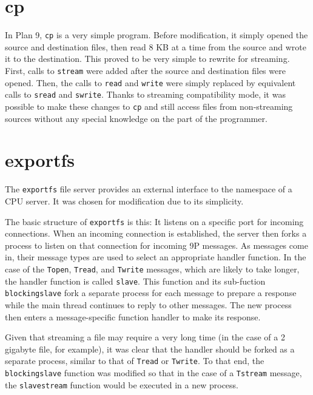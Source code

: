 \documentclass[11pt,american]{report}
\begin{document}
\section{cp}

In Plan 9, {\tt cp} is a very simple program. Before modification, it simply opened the source and destination files, then read 8 KB at a time from the source and wrote it to the destination. This proved to be very simple to rewrite for streaming. First, calls to {\tt stream} were added after the source and destination files were opened. Then, the calls to {\tt read} and {\tt write} were simply replaced by equivalent calls to {\tt sread} and {\tt swrite}. Thanks to streaming compatibility mode, it was possible to make these changes to {\tt cp} and still access files from non-streaming sources without any special knowledge on the part of the programmer.

\section{exportfs}

The {\tt exportfs} file server provides an external interface to the namespace of a CPU server. It was chosen for modification due to its simplicity.

The basic structure of {\tt exportfs} is this: It listens on a specific port for incoming connections. When an incoming connection is established, the server then forks a process to listen on that connection for incoming 9P messages. As messages come in, their message types are used to select an appropriate handler function. In the case of the {\tt Topen}, {\tt Tread}, and {\tt Twrite} messages, which are likely to take longer, the handler function is called {\tt slave}. This function and its sub-fuction {\tt blockingslave} fork a separate process for each message to prepare a response while the main thread continues to reply to other messages. The new process then enters a message-specific function handler to make its response.

Given that streaming a file may require a very long time (in the case of a 2 gigabyte file, for example), it was clear that the handler should be forked as a separate process, similar to that of {\tt Tread} or {\tt Twrite}. To that end, the {\tt blockingslave} function was modified so that in the case of a {\tt Tstream} message, the {\tt slavestream} function would be executed in a new process.
\end{document}
